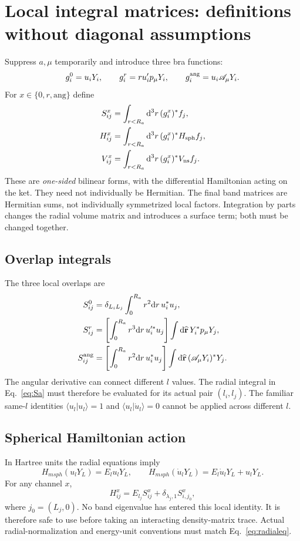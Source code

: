 \documentclass[11pt]{article}
\newcommand{\dd}{\mathrm d}
\newcommand{\newpart}[1]{\par\Needspace{12\baselineskip}\section{#1}}
\begin{document}
\newpart{Local integral matrices: definitions without diagonal assumptions}
\label{sec:integrals}
Suppress $a,\mu$ temporarily and introduce three bra functions:
\begin{equation}
 g_i^0=u_iY_i,\qquad
 g_i^r=r u_i'p_\mu Y_i,\qquad
 g_i^{\rm ang}=u_i\mathscr A_\mu Y_i.
 \label{eq:gfunctions}
\end{equation}
For $x\in\{0,r,\mathrm{ang}\}$ define
\begin{align}
 S^x_{ij}&=\int_{r<R_a}\dd^3r\,(g_i^x)^*f_j,\label{eq:Slocal}\\
 H^x_{ij}&=\int_{r<R_a}\dd^3r\,(g_i^x)^*H_{\rm sph}f_j,
              \label{eq:Hlocal}\\
 V^x_{ij}&=\int_{r<R_a}\dd^3r\,(g_i^x)^*V_{\rm ns}f_j.
              \label{eq:Vlocal}
\end{align}
These are \emph{one-sided} bilinear forms, with the differential
Hamiltonian acting on the ket. They need not individually be Hermitian.
The final band matrices are Hermitian sums, not individually symmetrized
local factors. Integration by parts changes the radial volume matrix
and introduces a surface term; both must be changed together.

\subsection{Overlap integrals}
The three local overlaps are
\begin{align}
 S^0_{ij}&=\delta_{L_iL_j}\int_0^{R_a}r^2\dd r\,u_i^*u_j,
                  \label{eq:S0}\\
 S^r_{ij}&=\left[\int_0^{R_a}r^3\dd r\,u_i'^*u_j\right]
              \int\dd\widehat{\mathbf r}\,Y_i^*p_\mu Y_j,
                  \label{eq:Sr}\\
 S^{\rm ang}_{ij}&=\left[\int_0^{R_a}r^2\dd r\,u_i^*u_j\right]
              \int\dd\widehat{\mathbf r}\,
                          (\mathscr A_\mu Y_i)^*Y_j.
                  \label{eq:Sa}
\end{align}
The angular derivative can connect different $l$ values. The radial
integral in Eq.~\eqref{eq:Sa} must therefore be evaluated for its actual
pair $(l_i,l_j)$. The familiar same-$l$ identities
$\langle u_l|u_l\rangle=1$ and
$\langle u_l|\dot u_l\rangle=0$ cannot be applied across different $l$.

\subsection{Spherical Hamiltonian action}
In Hartree units the radial equations imply
\begin{equation}
 H_{
m sph}(u_lY_L)=E_lu_lY_L,\qquad
 H_{
m sph}(\dot u_lY_L)=E_l\dot u_lY_L+u_lY_L.
 \label{eq:radialeq}
\end{equation}
For any channel $x$,
\begin{equation}
 \boxed{H^x_{ij}=E_{l_j}S^x_{ij}
                  +\delta_{\lambda_j,1}S^x_{i,j_0},}
 \label{eq:HfromS}
\end{equation}
where $j_0=(L_j,0)$. No band eigenvalue has entered this local identity.
It is therefore safe to use before taking an interacting density-matrix
trace. Actual radial-normalization and energy-unit conventions must
match Eq.~\eqref{eq:radialeq}.
\end{document}
